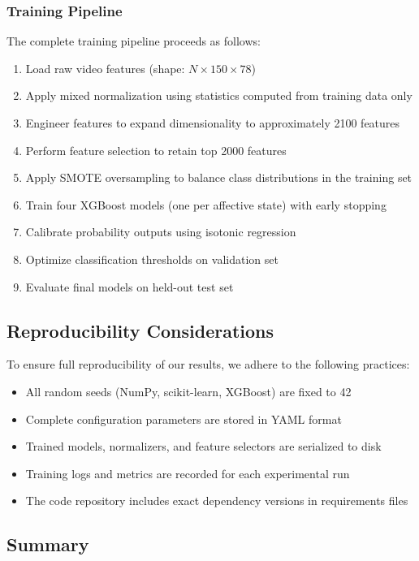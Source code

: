 \documentclass[11pt,a4paper]{article}
\begin{document}
\subsubsection{Training Pipeline}

The complete training pipeline proceeds as follows:

\begin{enumerate}
  \item Load raw video features (shape: $N \times 150 \times 78$)
  \item Apply mixed normalization using statistics computed from training data only
  \item Engineer features to expand dimensionality to approximately 2100 features
  \item Perform feature selection to retain top 2000 features
  \item Apply SMOTE oversampling to balance class distributions in the training set
  \item Train four XGBoost models (one per affective state) with early stopping
  \item Calibrate probability outputs using isotonic regression
  \item Optimize classification thresholds on validation set
  \item Evaluate final models on held-out test set
\end{enumerate}

\subsection{Reproducibility Considerations}

To ensure full reproducibility of our results, we adhere to the following practices:

\begin{itemize}
  \item All random seeds (NumPy, scikit-learn, XGBoost) are fixed to 42
  \item Complete configuration parameters are stored in YAML format
  \item Trained models, normalizers, and feature selectors are serialized to disk
  \item Training logs and metrics are recorded for each experimental run
  \item The code repository includes exact dependency versions in requirements files
\end{itemize}

\subsection{Summary}
\end{document}
